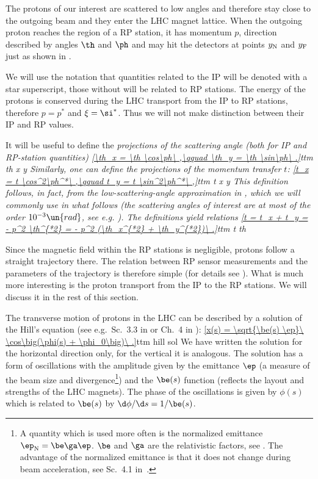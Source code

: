 The protons of our interest are scattered to low angles and therefore stay close to the outgoing beam and they enter the LHC magnet lattice. When the outgoing proton reaches the region of a RP station, it has momentum $p$, direction described by angles $\th$ and $\ph$ and may hit the detectors at points $y_{\rm N}$ and $y_{\rm F}$ just as shown in .

We will use the notation that quantities related to the IP will be denoted with a star superscript, those without will be related to RP stations. The energy of the protons is conserved during the LHC transport from the IP to RP stations, therefore $p = p^*$ and $\xi = \si^*$. Thus we will not make distinction between their IP and RP values.

It will be useful to define the \em{projections of the scattering angle} (both for IP and RP-station quantities)
\eqref{\th_x = \th \cos\ph\ ,\qquad \th_y = \th \sin\ph\ .}{ttm th x y}
Similarly, one can define the projections of the momentum transfer $t$:
\eqref{t_x = t \cos^2\ph^*\ ,\qquad t_y = t \sin^2\ph^*\ ,}{ttm t x y}
This definition follows, in fact, from the low-scattering-angle approximation in , which we will commonly use in what follows (the scattering angles of interest are at most of the order $10^{-3}\un{rad}$, see e.g. ). The definitions  yield relations
\eqref{t = t_x + t_y = - p^2 \th^{*2} = - p^2 (\th_x^{*2} + \th_y^{*2})\ .}{ttm t th}

Since the magnetic field within the RP stations is negligible, protons follow a straight trajectory there. The relation between RP sensor measurements and the parameters of the trajectory is therefore simple (for details see ). What is much more interesting is the proton transport from the IP to the RP stations. We will discuss it in the rest of this section.

The transverse motion of protons in the LHC can be described by a solution of the Hill's equation (see e.g.~Sc.~3.3 in  or Ch.~4 in ):
\eqref{x(s) = \sqrt{\be(s) \ep}\ \cos\big(\phi(s) + \phi_0\big)\ .}{ttm hill sol}
We have written the solution for the horizontal direction only, for the vertical it is analogous. The solution has a form of oscillations with the amplitude given by the emittance $\ep$ (a measure of the beam size and divergence\footnote{%
A quantity which is used more often is the normalized emittance $\ep_{\rm N} = \be\ga \ep$. $\be$ and $\ga$ are the relativistic factors, see . The advantage of the normalized emittance is that it does not change during beam acceleration, see Sc.~4.1 in~.
}) and the $\be(s)$ function (reflects the layout and strengths of the LHC magnets). The phase of the oscillations is given by $\phi(s)$ which is related to $\be(s)$ by $\d\phi/\d s = 1/\be(s)$.

